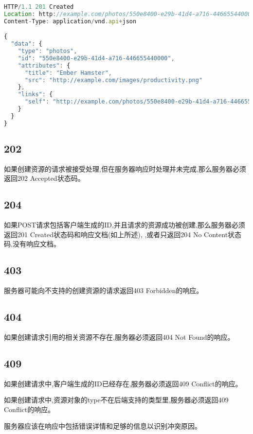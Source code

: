 \begin{lstlisting}[language=JavaScript]
HTTP/1.1 201 Created
Location: http://example.com/photos/550e8400-e29b-41d4-a716-446655440000
Content-Type: application/vnd.api+json

{
  "data": {
    "type": "photos",
    "id": "550e8400-e29b-41d4-a716-446655440000",
    "attributes": {
      "title": "Ember Hamster",
      "src": "http://example.com/images/productivity.png"
    },
    "links": {
      "self": "http://example.com/photos/550e8400-e29b-41d4-a716-446655440000"
    }
  }
}
\end{lstlisting}



\subsection{202}


如果创建资源的请求被接受处理,但在服务器响应时处理并未完成,那么服务器必须返回202 Accepted状态码。

\subsection{204}

如果POST请求包括客户端生成的ID,并且请求的资源成功被创建,那么服务器必须返回201 Created状态码和响应文档(如上所述), ,或者只返回204 No Content状态码,没有响应文档。

\subsection{403}

服务器可能向不支持的创建资源的请求返回403 Forbidden的响应。

\subsection{404}

如果创建请求引用的相关资源不存在,服务器必须返回404 Not Found的响应。

\subsection{409}

如果创建请求中,客户端生成的ID已经存在,服务器必须返回409 Conflict的响应。

如果创建请求中,资源对象的type不在后端支持的类型里,服务器必须返回409 Conflict的响应。

服务器应该在响应中包括错误详情和足够的信息以识别冲突原因。

